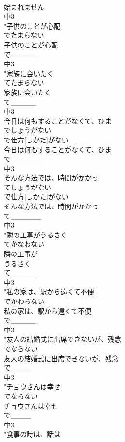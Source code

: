 \documentclass[8pt]{extreport}
\begin{document}
\begin{CJK}{UTF8}{min}
\\	始まれません
\\	中3
\\	"子供のことが心配
\\	でたまらない
\\	子供のことが心配
\\	で_____
\\	中3
\\	"家族に会いたく
\\	てたまらない
\\	家族に会いたく
\\	て_____
\\	中3
\\	今日は何もすることがなくて、ひま
\\	でしょうがない
\\	で仕方[しかた]がない
\\	今日は何もすることがなくて、ひま
\\	で______
\\	中3
\\	そんな方法では、時間がかかっ
\\	てしょうがない
\\	で仕方[しかた]がない
\\	そんな方法では、時間がかかっ
\\	て______
\\	中3
\\	"隣の工事がうるさく
\\	てかなわない
\\	隣の工事が
\\	うるさく
\\	て_____
\\	中3
\\	"私の家は、駅から遠くて不便
\\	でかわらない
\\	私の家は、駅から遠くて不便
\\	で_____
\\	中3
\\	"友人の結婚式に出席できないが、残念
\\	でならない
\\	友人の結婚式に出席できないが、残念
\\	で____
\\	中3
\\	"チョウさんは幸せ
\\	でならない
\\	チョウさんは幸せ
\\	で____
\\	中3
\\	"食事の時は、話は

\end{CJK}
\end{document}
